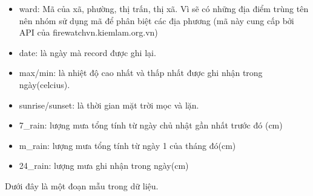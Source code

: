 \documentclass{article}
\begin{document}
\begin{itemize}
      \item ward: Mã của xã, phường, thị trấn, thị xã. Vì sẽ có những địa điểm trùng tên nên nhóm sử dụng mã để phân biệt các địa phương (mã này cung cấp bởi API của firewatchvn.kiemlam.org.vn\cite{website:firewatch-administrative})
      \item date: là ngày mà record được ghi lại.
      \item max/min: là nhiệt độ cao nhất và thấp nhất được ghi nhận trong ngày(celcius).
      \item sunrise/sunset: là thời gian mặt trời mọc và lặn.
      \item 7\_rain: lượng mưa tổng tính từ ngày chủ nhật gần nhất trước đó (cm)
      \item m\_rain: lượng mưa tổng tính từ ngày 1 của tháng đó(cm)
      \item 24\_rain: lượng mưa ghi nhận trong ngày(cm)
\end{itemize}

Dưới đây là một đoạn mẫu trong dữ liệu.
\end{document}
